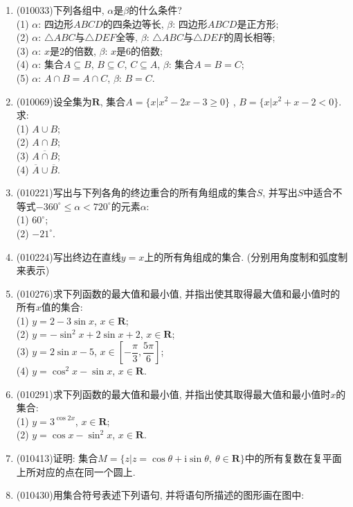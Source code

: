 \documentclass[10pt,a4paper]{article}
\begin{document}
\begin{enumerate}[1.]
\item {\tiny (010033)}下列各组中, $\alpha$是$\beta$的什么条件?\\
(1) $\alpha$: 四边形$ABCD$的四条边等长, $\beta$: 四边形$ABCD$是正方形;\\
(2) $\alpha$: $\triangle ABC$与$\triangle DEF$全等, $\beta$: $\triangle ABC$与$\triangle DEF$的周长相等;\\
(3) $\alpha$: $x$是$2$的倍数, $\beta$: $x$是$6$的倍数;\\
(4) $\alpha$: 集合$A\subseteq B$, $B\subseteq C$, $C\subseteq A$, $\beta$: 集合$A=B=C$;\\
(5) $\alpha$: $A\cap B=A\cap C$, $\beta$: $B=C$.
\item {\tiny (010069)}设全集为$\mathbf{R}$, 集合$A=\{x|x^2-2x-3\ge 0\}$
, $B=\{x|x^2+x-2<0\}$. 求:\\
(1) $A\cup B$;\\
(2) $A\cap B$;\\
(3) $\overline{A\cap B}$;\\
(4) $\overline A\cup \overline B$.
\item {\tiny (010221)}写出与下列各角的终边重合的所有角组成的集合$S$, 并写出$S$中适合不等式$-360^\circ \le \alpha<720^\circ$的元素$\alpha$:\\
(1) $60^\circ$;\\
(2) $-21^\circ$.
\item {\tiny (010224)}写出终边在直线$y=x$上的所有角组成的集合. (分别用角度制和弧度制来表示)
\item {\tiny (010276)}求下列函数的最大值和最小值, 并指出使其取得最大值和最小值时的所有$x$值的集合:\\
(1) $y=2-3\sin x$, $x\in \mathbf{R}$;\\
(2) $y=-\sin^2x+2\sin x+2$, $x\in \mathbf{R}$;\\
(3) $y=2\sin x-5$, $x\in [-\dfrac \pi 3, \dfrac{5\pi} 6]$;\\
(4) $y=\cos^2x-\sin x$, $x\in \mathbf{R}$.
\item {\tiny (010291)}求下列函数的最大值和最小值, 并指出使其取得最大值和最小值时$x$的集合:\\
(1) $y=3^{\cos 2x}$, $x\in \mathbf{R}$;\\
(2) $y=\cos x-\sin^2x$, $x\in \mathbf{R}$.
\item {\tiny (010413)}证明: 集合$M=\{z|z=\cos \theta +\mathrm{i}\sin \theta,\ \theta \in \mathbf{R}\}$中的所有复数在复平面上所对应的点在同一个圆上.
\item {\tiny (010430)}用集合符号表述下列语句, 并将语句所描述的图形画在图中:\\

\end{enumerate}
\end{document}
